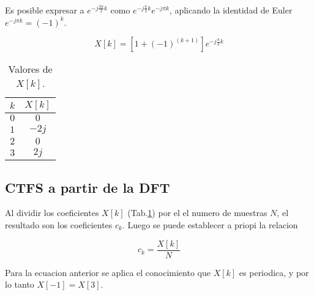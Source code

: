 \documentclass[letterpaper]{article}
\begin{document}
    Es posible expresar a $e^{-j\frac{ 3 \pi}{2}k}$ como $e^{-j \frac{\pi }{2}k}e^{-j\pi k}$, aplicando la identidad de Euler 
    $e^{-j \pi k}= (-1)^k$. 

    \begin{equation}
        X[k]= [ 1 + (-1)^(k+1) ] e^{ -j \frac{\pi }{2} k }
    \end{equation}

    \begin{table}[H]
        \centering
        \begin{tabular}{|c|c|}
            \hline $k$ & $X[k]$ \\
            \hline $0$ & $0$ \\
            \hline $1$ & $-2j$ \\
            \hline $2$ & $0$ \\
            \hline $3$ & $2j$ \\
            \hline
        \end{tabular}
        \caption{Valores de $X[k]$.}
        \label{tab.xk}
    \end{table}

    \subsection{CTFS a partir de la DFT}

    Al dividir los coeficientes $X[k]$ (Tab.\ref{tab.xk}) por el el numero de muestras $N$, el resultado son los coeficientes 
    $c_k$. Luego se puede establecer a priopi la relacion 
    
    \begin{equation}
        c_k = \frac{X[k]}{N}
    \end{equation}

    Para la ecuacion anterior se aplica el conocimiento que $X[k]$ es periodica, y por lo tanto $X[-1]=X[3]$.
\end{document}
